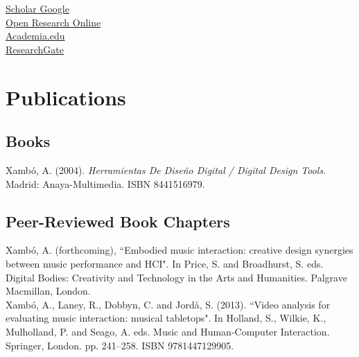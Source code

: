 \documentclass[10pt, a4paper]{article}
\newcommand{\years}[1]{\marginnote{\scriptsize #1}}
\begin{document}
\textbullet \- \href{https://scholar.google.com/citations?user=yi3WXM8AAAAJ}{Scholar Google}\\
\textbullet \- \href{http://oro.open.ac.uk/view/person/ax22.html}{Open Research Online}\\
\textbullet \- \href{http://open.academia.edu/AnnaXambo}{Academia.edu}\\
\textbullet \- \href{http://www.researchgate.net/profile/Anna_Xambo}{ResearchGate}

\section*{Publications}
\noindent

\subsection*{Books}
\noindent
\years{2004}Xambó, A. (2004). \emph{Herramientas De Diseño Digital / Digital Design Tools}. Madrid: Anaya-Multimedia. ISBN 8441516979.

\subsection*{Peer-Reviewed Book Chapters}
\noindent
\years{2016}Xambó, A. (forthcoming), “Embodied music interaction: creative design synergies between music performance and HCI". In Price, S. and Broadhurst, S. eds. Digital Bodies: Creativity and Technology in the Arts and Humanities. Palgrave Macmillan, London.\\
\years{2013}Xambó, A., Laney, R., Dobbyn, C. and Jordà, S. (2013). “Video analysis for evaluating music interaction: musical tabletops". In Holland, S., Wilkie, K., Mulholland, P. and Seago, A. eds. Music and Human-Computer Interaction. Springer, London. pp. 241--258. ISBN 9781447129905.
\end{document}
